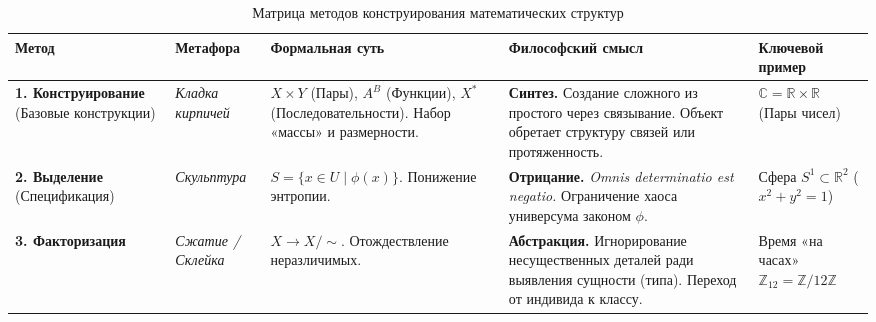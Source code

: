 \documentclass[11pt, a4paper]{extarticle}
\newcommand{\Z}{{\mathbb Z}}
\newcommand{\R}{{\mathbb R}}
\newcommand{\C}{{\mathbb C}}
\begin{document}
\begin{table}[h!]
    \hspace*{-8cm}
    \begin{minipage}{24cm} 
        \caption{Матрица методов конструирования математических структур}
        \label{tab:methods_matrix}
        
        \centering
        \small 
        \renewcommand{\arraystretch}{1.5} 
        
        \begin{tabular}{@{} p{3.5cm} p{3cm} p{5.5cm} p{7cm} p{3.5cm} @{}}
            \toprule
            \textbf{\color{darkblue} Метод} & 
            \textbf{\color{darkblue} Метафора} & 
            \textbf{\color{darkblue} Формальная суть} & 
            \textbf{\color{darkblue} Философский смысл} & 
            \textbf{\color{darkblue} Ключевой пример} \\ 
            \midrule
            
            \textbf{1. Конструирование} \newline (Базовые конструкции) & 
            \textit{Кладка кирпичей} & 
            $X \times Y$ (Пары), $A^B$ (Функции), \newline $X^*$ (Последовательности). \newline Набор «массы» и размерности. & 
            \textbf{Синтез.} Создание сложного из простого через связывание. Объект обретает структуру связей или протяженность. & 
            $\C = \R \times \R$ \newline (Пары чисел) \\ 
            \midrule
            
            \textbf{2. Выделение} \newline (Спецификация) & 
            \textit{Скульптура} & 
            $S = \{x \in U \mid \phi(x)\}$. \newline Понижение энтропии. & 
            \textbf{Отрицание.} \textit{Omnis determinatio est negatio.} Ограничение хаоса универсума законом $\phi$. & 
            Сфера $S^1 \subset \R^2$ \newline ($x^2+y^2=1$) \\ 
            \midrule
            
            \textbf{3. Факторизация} & 
            \textit{Сжатие / Склейка} & 
            $X \to X/{\sim}$. \newline Отождествление неразличимых. & 
            \textbf{Абстракция.} Игнорирование несущественных деталей ради выявления сущности (типа). Переход от индивида к классу. & 
            Время «на часах» \newline $\Z_{12} = \Z / 12\Z$ \\ 
            \midrule
            

\end{tabular}
\end{minipage}
\end{table}
\end{document}
